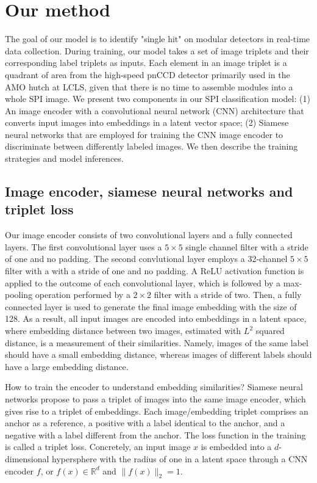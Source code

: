 \section{Our method}

The goal of our model is to identify "single hit" on modular detectors in
real-time data collection.  During training, our model takes a set of image
triplets and their corresponding label triplets as inputs.  Each element in an
image triplet is a quadrant of area from the high-speed pnCCD detector primarily
used in the AMO hutch at LCLS, given that there is no time to assemble modules
into a whole SPI image.  We present two components in our SPI classification
model: (1) An image encoder with a convolutional neural network (CNN)
architecture that converts input images into embeddings in a latent vector space;
(2) Siamese neural networks that are employed for training the CNN image encoder
to discriminate between differently labeled images.  We then describe the
training strategies and model inferences.  


\subsection{Image encoder, siamese neural networks and triplet loss}

Our image encoder consists of two convolutional layers and a fully connected
layers.  The first convolutional layer uses a $5 \times 5$ single channel filter
with a stride of one and no padding.  The second convlutional layer employs a
32-channel $5 \times 5$ filter with a with a stride of one and no padding.  A
ReLU activation function is applied to the outcome of each convolutional layer,
which is followed by a max-pooling operation performed by a $2\times 2$ filter
with a stride of two.  Then, a fully connected layer is used to generate the
final image embedding with the size of 128.  As a result, all input images are
encoded into embeddings in a latent space, where embedding distance between two
images, estimated with $L^2$ squared distance, is a measurement of their
similarities.  Namely, images of the same label should have a small embedding
distance, whereas images of different labels should have a large embedding
distance.  


How to train the encoder to understand embedding similarities?  Siamese neural
networks propose to pass a triplet of images into the same image encoder, which
gives rise to a triplet of embeddings.  Each image/embedding triplet comprises
an anchor as a reference, a positive with a label identical to the anchor, and a
negative with a label different from the anchor.  The loss function in the
training is called a triplet loss.  Concretely, an input image $x$ is embedded
into a $d$-dimensional hypersphere with the radius of one in a latent space
through a CNN encoder $f$, or $f(x) \in \mathbb{R}^d$ and $\|f(x)\|_2=1$.  


